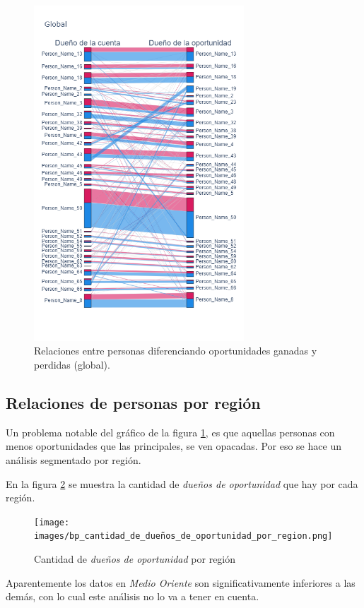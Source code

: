\documentclass[titlepage,a4paper]{article}
\begin{document}
\begin{figure}[H]
\centering
\includegraphics[width=0.7\textwidth]{images/ps_personas_GLOBAL.png}
\cprotect\caption{\label{fig:ps_personas_GLOBAL} Relaciones entre personas diferenciando oportunidades ganadas y perdidas (global).}
\end{figure}

\subsection{Relaciones de personas por región}
Un problema notable del gráfico de la figura \ref{fig:ps_personas_GLOBAL}, es que aquellas personas con menos oportunidades que las principales, se ven opacadas. Por eso se hace un análisis segmentado por región.

En la figura \ref{fig:bp_cantidad_de_dueños_de_oportunidad_por_region} se muestra la cantidad de \textit{dueños de oportunidad} que hay por cada región.

\begin{figure}[H]
\centering
\texttt{[image: images/bp\_cantidad\_de\_dueños\_de\_oportunidad\_por\_region.png]}
\cprotect\caption{\label{fig:bp_cantidad_de_dueños_de_oportunidad_por_region} Cantidad de \textit{dueños de oportunidad} por región}
\end{figure}
Aparentemente los datos en \textit{Medio Oriente} son significativamente inferiores a las demás, con lo cual este análisis no lo va a tener en cuenta.
\end{document}

